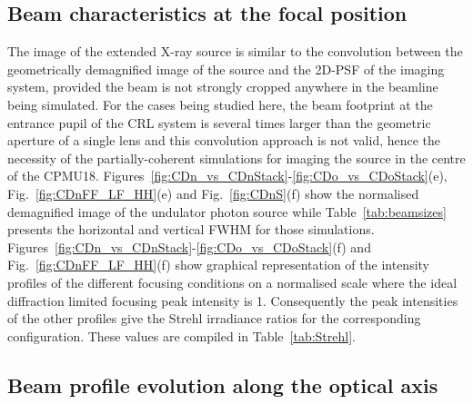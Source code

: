 \begin{refsection}

\subsection{Beam characteristics at the focal position}\label{sec:source_image_sim}

The image of the extended X-ray source is similar to the convolution between the geometrically demagnified image of the source and the 2D-PSF of the imaging system, provided the beam is not strongly cropped anywhere in the beamline being simulated. For the cases being studied here, the beam footprint at the entrance pupil of the CRL system is several times larger than the geometric aperture of a single lens and this convolution approach is not valid, hence the necessity of the partially-coherent simulations for imaging the source in the centre of the CPMU18. Figures~\ref{fig:CDn_vs_CDnStack}-\ref{fig:CDo_vs_CDoStack}(e), Fig.~\ref{fig:CDnFF_LF_HH}(e) and Fig.~\ref{fig:CDnS}(f) show the normalised demagnified image of the undulator photon source while Table~\ref{tab:beamsizes} presents the horizontal and vertical FWHM for those simulations. Figures~\ref{fig:CDn_vs_CDnStack}-\ref{fig:CDo_vs_CDoStack}(f) and Fig.~\ref{fig:CDnFF_LF_HH}(f) show graphical representation of the intensity profiles of the different focusing conditions on a normalised scale where the ideal diffraction limited focusing peak intensity is 1. Consequently the peak intensities of the other profiles give the Strehl irradiance ratios for the corresponding configuration. These values are compiled in Table~\ref{tab:Strehl}.

\subsection{Beam profile evolution along the optical axis}\label{sec:partcaustics_sim}


\end{refsection}
